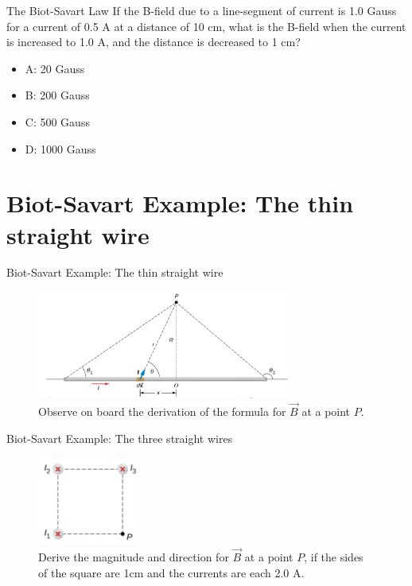 \documentclass{beamer}
\begin{document}
\begin{frame}{The Biot-Savart Law}
If the B-field due to a line-segment of current is 1.0 Gauss for a current of 0.5 A at a distance of 10 cm, what is the B-field when the current is increased to 1.0 A, and the distance is decreased to 1 cm?
\begin{itemize}
\item A: 20 Gauss
\item B: 200 Gauss
\item C: 500 Gauss
\item D: 1000 Gauss
\end{itemize}
\end{frame}

\section{Biot-Savart Example: The thin straight wire}

\begin{frame}{Biot-Savart Example: The thin straight wire}
\begin{figure}
\centering
\includegraphics[width=0.75\textwidth]{figures/biot2.png}
\caption{\label{fig:biot2} Observe on board the derivation of the formula for $\vec{B}$ at a point $P$.}
\end{figure}
\end{frame}

\begin{frame}{Biot-Savart Example: The three straight wires}
\begin{figure}
\centering
\includegraphics[width=0.3\textwidth]{figures/biot3.png}
\caption{\label{fig:biot3} Derive the magnitude and direction for $\vec{B}$ at a point $P$, if the sides of the square are 1cm and the currents are each 2.0 A.}
\end{figure}
\end{frame}
\end{document}
